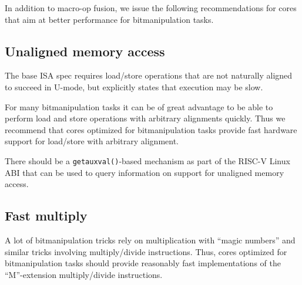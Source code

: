 In addition to macro-op fusion, we issue the following recommendations for
cores that aim at better performance for bitmanipulation tasks.

\subsection{Unaligned memory access}

The base ISA spec requires load/store operations that are not naturally aligned
to succeed in U-mode, but explicitly states that execution may be slow.

For many bitmanipulation tasks it can be of great advantage to be able to
perform load and store operations with arbitrary alignments quickly. Thus we
recommend that cores optimized for bitmanipulation tasks provide fast hardware
support for load/store with arbitrary alignment.

There should be a {\tt getauxval()}-based mechanism as part of the RISC-V Linux
ABI that can be used to query information on support for unaligned memory
access.~\cite{FastLdSt}

\subsection{Fast multiply}

A lot of bitmanipulation tricks rely on multiplication with ``magic numbers'' and
similar tricks involving multiply/divide instructions. Thus, cores optimized for
bitmanipulation tasks should provide reasonably fast implementations of the
``M''-extension multiply/divide instructions.


